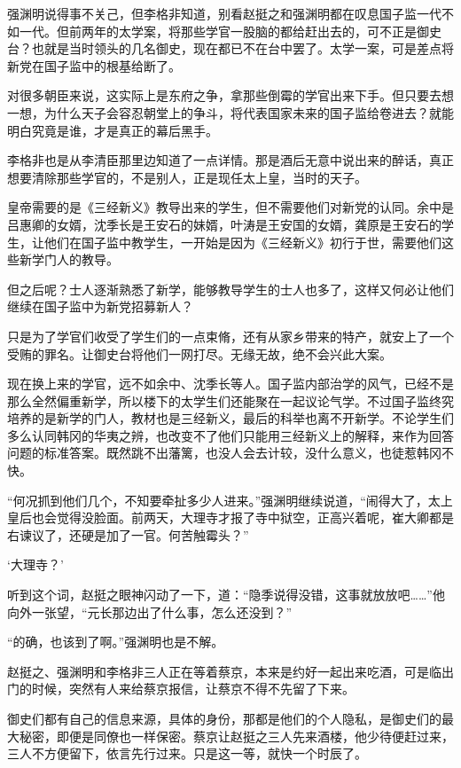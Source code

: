 强渊明说得事不关己，但李格非知道，别看赵挺之和强渊明都在叹息国子监一代不如一代。但前两年的太学案，将那些学官一股脑的都给赶出去的，可不正是御史台？也就是当时领头的几名御史，现在都已不在台中罢了。太学一案，可是差点将新党在国子监中的根基给断了。

对很多朝臣来说，这实际上是东府之争，拿那些倒霉的学官出来下手。但只要去想一想，为什么天子会容忍朝堂上的争斗，将代表国家未来的国子监给卷进去？就能明白究竟是谁，才是真正的幕后黑手。

李格非也是从李清臣那里边知道了一点详情。那是酒后无意中说出来的醉话，真正想要清除那些学官的，不是别人，正是现任太上皇，当时的天子。

皇帝需要的是《三经新义》教导出来的学生，但不需要他们对新党的认同。余中是吕惠卿的女婿，沈季长是王安石的妹婿，叶涛是王安国的女婿，龚原是王安石的学生，让他们在国子监中教学生，一开始是因为《三经新义》初行于世，需要他们这些新学门人的教导。

但之后呢？士人逐渐熟悉了新学，能够教导学生的士人也多了，这样又何必让他们继续在国子监中为新党招募新人？

只是为了学官们收受了学生们的一点束脩，还有从家乡带来的特产，就安上了一个受贿的罪名。让御史台将他们一网打尽。无缘无故，绝不会兴此大案。

现在换上来的学官，远不如余中、沈季长等人。国子监内部治学的风气，已经不是那么全然偏重新学，所以楼下的太学生们还能聚在一起议论气学。不过国子监终究培养的是新学的门人，教材也是三经新义，最后的科举也离不开新学。不论学生们多么认同韩冈的华夷之辨，也改变不了他们只能用三经新义上的解释，来作为回答问题的标准答案。既然跳不出藩篱，也没人会去计较，没什么意义，也徒惹韩冈不快。

“何况抓到他们几个，不知要牵扯多少人进来。”强渊明继续说道，“闹得大了，太上皇后也会觉得没脸面。前两天，大理寺才报了寺中狱空，正高兴着呢，崔大卿都是右谏议了，还硬是加了一官。何苦触霉头？”

‘大理寺？’

听到这个词，赵挺之眼神闪动了一下，道：“隐季说得没错，这事就放放吧……”他向外一张望，“元长那边出了什么事，怎么还没到？”

“的确，也该到了啊。”强渊明也是不解。

赵挺之、强渊明和李格非三人正在等着蔡京，本来是约好一起出来吃酒，可是临出门的时候，突然有人来给蔡京报信，让蔡京不得不先留了下来。

御史们都有自己的信息来源，具体的身份，那都是他们的个人隐私，是御史们的最大秘密，即便是同僚也一样保密。蔡京让赵挺之三人先来酒楼，他少待便赶过来，三人不方便留下，依言先行过来。只是这一等，就快一个时辰了。

